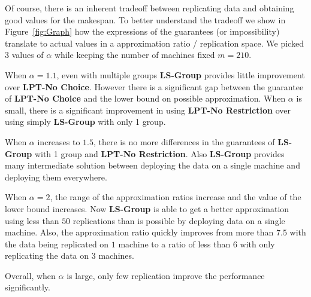 \documentclass[10pt, conference, compsocconf]{IEEEtran}
\begin{document}
Of course, there is an inherent tradeoff between replicating data and
obtaining good values for the makespan. To better understand the
tradeoff we show in Figure~\ref{fig:Graph} how the expressions of the
guarantees (or impossibility) translate to actual values in a
approximation ratio / replication space.  We picked 3 values of
$\alpha$ while keeping the number of machines fixed $m=210$. 

When $\alpha=1.1$, even with multiple groups {\bf LS-Group} provides little
improvement over {\bf LPT-No Choice}. However there is a significant
gap between the guarantee of {\bf LPT-No Choice} and the lower bound
on possible approximation. When $\alpha$ is small, there is a
significant improvement in using {\bf LPT-No Restriction} over using
simply {\bf LS-Group} with only 1 group.

When $\alpha$ increases to $1.5$, there is no more differences in the
guarantees of {\bf LS-Group} with 1 group and {\bf LPT-No
  Restriction}. Also {\bf LS-Group} provides many intermediate
solution between deploying the data on a single machine and deploying
them everywhere.

When $\alpha=2$, the range of the approximation ratios increase and
the value of the lower bound increases. Now {\bf LS-Group} is able to
get a better approximation using less than $50$ replications than is
possible by deploying data on a single machine. Also, the
approximation ratio quickly improves from more than $7.5$ with the
data being replicated on $1$ machine to a ratio of less than $6$ with
only replicating the data on $3$ machines.

Overall, when $\alpha$ is large, only few replication improve the
performance significantly.
\end{document}
